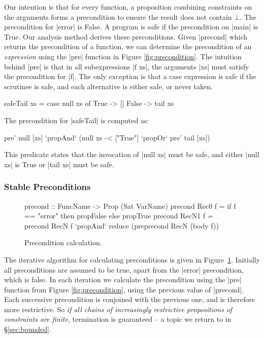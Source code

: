 \documentclass[preprint]{sigplanconf}
\begin{document}
Our intention is that for every function, a proposition combining constraints on the arguments forms a precondition to ensure the result does not contain $\bot{}$. The precondition for |error| is False. A program is safe if the precondition on |main| is True. Our analysis method derives these preconditions. Given |precond| which returns the precondition of a function, we can determine the precondition of an \textit{expression} using the |pre| function in Figure \ref{fig:precondition}. The intuition behind |pre| is that in all subexpressions |f xs|, the arguments |xs| must satisfy the precondition for |f|. The only exception is that a case expression is safe if the scrutinee is safe, and each alternative is either safe, or never taken.

\begin{example}
\label{ex:safeTail}
\begin{code}
safeTail xs = case  null xs of
                    True   -> []
                    False  -> tail xs
\end{code}

\noindent The precondition for |safeTail| is computed as:

\ignore\begin{code}
pre' null [xs] `propAnd` (null xs -< ["True"] `propOr` pre' tail [xs])
\end{code}

This predicate states that the invocation of |null xs| must be safe, and either |null xs| is True or |tail xs| must be safe.
\end{example}


\subsubsection{Stable Preconditions}
\label{sec:fixp_precond}


\begin{figure}
\ignore\begin{code}
precond  :: FuncName -> Prop (Sat VarName)
precond Rec0   f =  if f == "error" then propFalse else propTrue
precond RecN1  f =  precond RecN f `propAnd`
                    reduce (pre{precond RecN} (body f))
\end{code}
\caption{Precondition calculation.}
\label{fig:precond_fixp}
\end{figure}

The iterative algorithm for calculating preconditions is given in Figure~\ref{fig:precond_fixp}. Initially all preconditions are assumed to be true, apart from the |error| precondition, which is false. In each iteration we calculate the precondition using the |pre| function from Figure \ref{fig:precondition}, using the previous value of |precond|. Each successive precondition is conjoined with the previous one, and is therefore more restrictive. So \textit{if all chains of increasingly restrictive propositions of constraints are finite}, termination is guaranteed -- a topic we return to in \S\ref{sec:bounded}.
\end{document}
